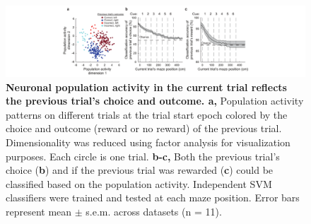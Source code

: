 \begin{figure}
\includegraphics[width=1.6\textwidth,center]{figures/fig_3_12.pdf}
\caption[Neuronal population activity in the current trial reflects the previous trial's choice and outcome.]
{\textbf{Neuronal population activity in the current trial reflects the previous trial's choice and outcome. a,} Population activity patterns on different trials at the trial start epoch colored by the choice and outcome (reward or no reward) of the previous trial. Dimensionality was reduced using factor analysis for visualization purposes. Each circle is one trial. 
%
\textbf{b-c,} Both the previous trial's choice (\textbf{b}) and if the previous trial was rewarded (\textbf{c}) could be classified based on the population activity. Independent SVM classifiers were trained and tested at each maze position. Error bars represent mean $\pm$ s.e.m. across datasets (n = 11).
\label{fig:3_12}}
\end{figure}

